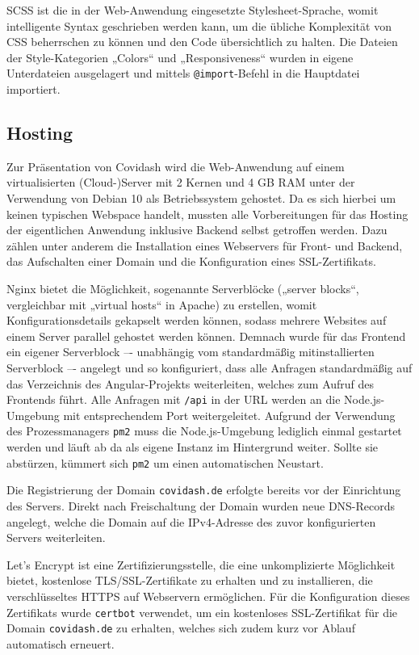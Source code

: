 \documentclass[conference]{IEEEtran}
\begin{document}
SCSS ist die in der Web-Anwendung eingesetzte Stylesheet-Sprache, womit intelligente Syntax geschrieben werden kann, um die übliche Komplexität von CSS beherrschen zu können und den Code übersichtlich zu halten. Die Dateien der Style-Kategorien „Colors“ und „Responsiveness“ wurden in eigene Unterdateien ausgelagert und mittels \texttt{@import}-Befehl in die Hauptdatei importiert.



\subsection{Hosting}

Zur Präsentation von Covidash wird die Web-Anwendung auf einem virtualisierten (Cloud-)Server mit 2 Kernen und 4 GB RAM unter der Verwendung von Debian 10 als Betriebssystem gehostet. Da es sich hierbei um keinen typischen Webspace handelt, mussten alle Vorbereitungen für das Hosting der eigentlichen Anwendung inklusive Backend selbst getroffen werden. Dazu zählen unter anderem die Installation eines Webservers für Front- und Backend, das Aufschalten einer Domain und die Konfiguration eines SSL-Zertifikats.

Nginx bietet die Möglichkeit, sogenannte Serverblöcke („server blocks“, vergleichbar mit „virtual hosts“ in Apache) zu erstellen, womit Konfigurationsdetails gekapselt werden können, sodass mehrere Websites auf einem Server parallel gehostet werden können. Demnach wurde für das Frontend ein eigener Serverblock –- unabhängig vom standardmäßig mitinstallierten Serverblock –- angelegt und so konfiguriert, dass alle Anfragen standardmäßig auf das Verzeichnis des Angular-Projekts weiterleiten, welches zum Aufruf des Frontends führt. Alle Anfragen mit \texttt{/api} in der URL werden an die Node.js-Umgebung mit entsprechendem Port weitergeleitet. Aufgrund der Verwendung des Prozessmanagers \texttt{pm2}\cite{pm2} muss die Node.js-Umgebung lediglich einmal gestartet werden und läuft ab da als eigene Instanz im Hintergrund weiter. Sollte sie abstürzen, kümmert sich \texttt{pm2} um einen automatischen Neustart.

Die Registrierung der Domain \texttt{covidash.de} erfolgte bereits vor der Einrichtung des Servers. Direkt nach Freischaltung der Domain wurden neue DNS-Records angelegt, welche die Domain auf die IPv4-Adresse des zuvor konfigurierten Servers weiterleiten.

Let's Encrypt ist eine Zertifizierungsstelle, die eine unkomplizierte Möglichkeit bietet, kostenlose TLS/SSL-Zertifikate zu erhalten und zu installieren, die verschlüsseltes HTTPS auf Webservern ermöglichen. Für die Konfiguration dieses Zertifikats wurde \texttt{certbot}\cite{certbot} verwendet, um ein kostenloses SSL-Zertifikat für die Domain \texttt{covidash.de} zu erhalten, welches sich zudem kurz vor Ablauf automatisch erneuert.
\end{document}
